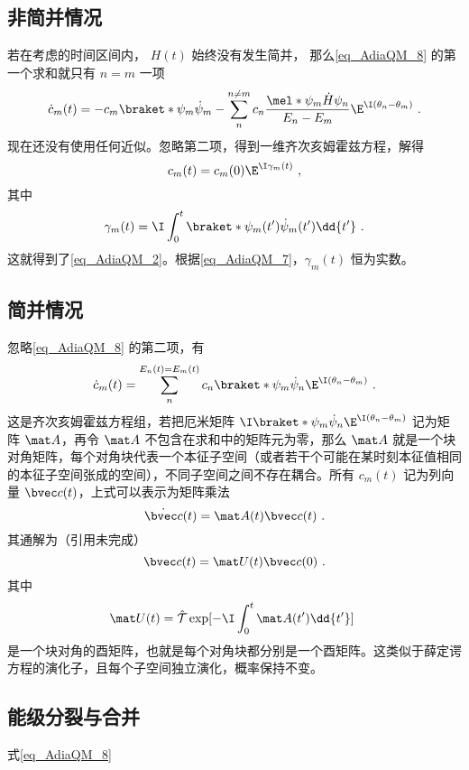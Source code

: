 \subsection{非简并情况}
若在考虑的时间区间内， $H(t)$ 始终没有发生简并， 那么\autoref{eq_AdiaQM_8} 的第一个求和就只有 $n=m$ 一项
\begin{equation}
\dot c_m(t) = -c_m \braket*{\psi_m}{\dot\psi_m} - \sum_{n}^{n\ne m} c_n \frac{\mel*{\psi_m}{\dot H}{\psi_n}}{E_n-E_m} \E^{\I(\theta_n-\theta_m)}~.
\end{equation}
现在还没有使用任何近似。忽略第二项，得到一维齐次亥姆霍兹方程，解得
\begin{equation}
c_m(t) = c_m(0)\E^{\I\gamma_m(t)}~,
\end{equation}
其中
\begin{equation}
\gamma_m(t) = \I \int_0^t \braket*{\psi_m(t')}{\dot\psi_m(t')}\dd{t'}~.
\end{equation}
这就得到了\autoref{eq_AdiaQM_2}。根据\autoref{eq_AdiaQM_7}，$\gamma_m(t)$ 恒为实数。

\subsection{简并情况}
忽略\autoref{eq_AdiaQM_8} 的第二项，有
\begin{equation}
\dot c_m(t) = \sum_{n}^{E_n(t)=E_m(t)} c_n \braket*{\psi_m}{\dot\psi_n}\E^{\I(\theta_n-\theta_m)}~.
\end{equation}
这是齐次亥姆霍兹方程组，若把厄米矩阵 $\I\braket*{\psi_m}{\dot\psi_n}\E^{\I(\theta_n-\theta_m)}$ 记为矩阵 $\mat A$，再令 $\mat A$ 不包含在求和中的矩阵元为零，那么 $\mat A$ 就是一个块对角矩阵，每个对角块代表一个本征子空间（或者若干个可能在某时刻本征值相同的本征子空间张成的空间），不同子空间之间不存在耦合。所有 $c_m(t)$ 记为列向量 $\bvec c(t)$，上式可以表示为矩阵乘法
\begin{equation}
\dot{\bvec c}(t) = \mat A(t) \bvec c(t)~.
\end{equation}
其通解为（引用未完成）
\begin{equation}
\bvec c(t) = \mat U(t)\bvec c(0)~.
\end{equation}
其中
\begin{equation}
\mat U(t) = \hat{\mathcal{T}}\exp[-\I \int_0^t \mat A(t') \dd{t'}]~
\end{equation}
是一个块对角的酉矩阵，也就是每个对角块都分别是一个酉矩阵。这类似于薛定谔方程的演化子，且每个子空间独立演化，概率保持不变。


\subsection{能级分裂与合并}
式\autoref{eq_AdiaQM_8} 
